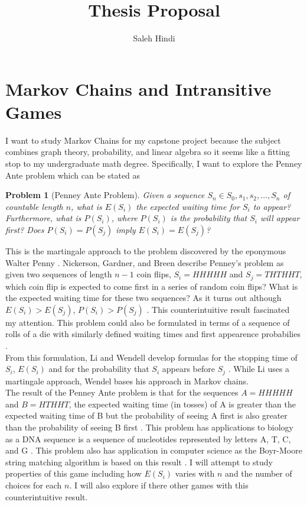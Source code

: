 \documentclass{article}
\newtheorem{theorem}{Problem}[section]
\numberwithin{mytheorem}{subsection} %
\begin{document}
	\title{Thesis Proposal}
	\author{Saleh Hindi}

	\maketitle

	\section{Markov Chains and Intransitive Games}
	I want to study Markov Chains for my capstone project because the subject combines graph theory, probability, and linear algebra so it seems like a fitting stop to my undergraduate math degree. Specifically, I want to explore the Penney Ante problem which can be stated as 
	
	\begin{theorem}[Penney Ante Problem]
	\label{penney}
		Given a sequence $S_n \in {S_0, s_1, s_2, \dots, S_n}$ of countable length $n$, what is $E(S_i)$ the expected waiting time for $S_i$ to appear? Furthermore, what is $P(S_i)$, where $P(S_i)$ is the probability that $S_i$ will appear first? Does $P(S_i) = P(S_j)$ imply $E(S_i) = E(S_j)$? 
	\end{theorem}
	
	This is the martingale approach to the problem discovered by the eponymous Walter Penny  \cite{gardner}. Nickerson, Gardner, and Breen describe Penney's problem as given two sequences of length $n-1$ coin flips, $S_i = HHHHH$ and $S_j = THTHHT$, which coin flip is expected to come first in a series of random coin flips? What is the expected waiting time for these two sequences? As it turns out although $E(S_i) > E(S_j)$, $P(S_i) > P(S_j)$ \cite{nickerson} \cite{gardner} \cite{breen}. This counterintuitive result fascinated my attention. This problem could also be formulated in terms of a sequence of rolls of a die with similarly defined waiting times and first appearence probabilies \cite{li}.    \\

	From this formulation, Li and Wendell develop formulas for the stopping time of $S_i$, $E(S_i)$ and for the probability that $S_i$ appears before $S_j$ \cite{li}. While Li uses a martingale approach, Wendel bases his approach in Markov chains. \cite{wendel} \\

    The result of the Penney Ante problem is that for the sequences $A =  HHHHH$ and $B = HTHHT$, the expected waiting time (in tosses) of A is greater than the expected waiting time of B but the probability of seeing A first is also greater than the probability of seeing B first \cite{nickerson}. This problem has applications to biology as a DNA sequence is a sequence of nucleotides represented by letters A, T, C, and G \cite{breen}. This problem also has application in computer science as the Boyr-Moore string matching algorithm is based on this result \cite{breen}. I will attempt to study properties of this game including how $E(S_i)$ varies with $n$ and the number of choices for each $n$. I will also explore if there other games with this counterintuitive result.
\end{document}
